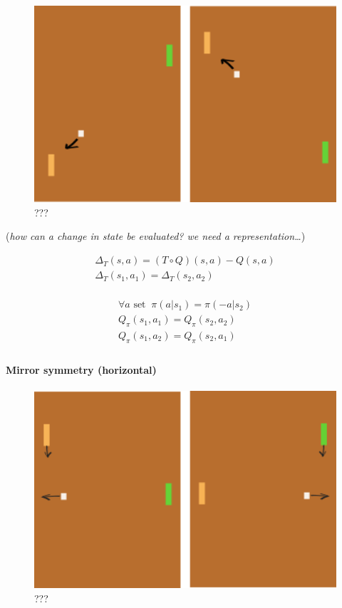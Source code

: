 \begin{figure}
\centering
\includegraphics[width=1\textwidth,height=0.25\textheight]{../../pictures/drawings/pong-vert-flip.png}
\caption{???}
\end{figure}

(\emph{how can a change in state be evaluated? we need a
representation\ldots{}})

\begin{align}
\Delta_{T}(s, a) = (T \circ Q)(s,a) - Q(s,a)\\
\Delta_{T}(s_1, a_1) = \Delta_{T}(s_2, a_2) \\
\end{align}

\begin{align}
\forall a \text{ set}\;\;\pi(a | s_1) = \pi(-a| s_2) \\
Q_\pi(s_1, a_1) = Q_\pi(s_2, a_2) \\
Q_\pi(s_1, a_2) = Q_\pi(s_2, a_1) \\
\end{align}

\hypertarget{mirror-symmetry-horizontal}{%
\paragraph{Mirror symmetry
(horizontal)}\label{mirror-symmetry-horizontal}}

\begin{figure}
\centering
\includegraphics[width=1\textwidth,height=0.25\textheight]{../../pictures/drawings/pong-horz-flip.png}
\caption{???}
\end{figure}

